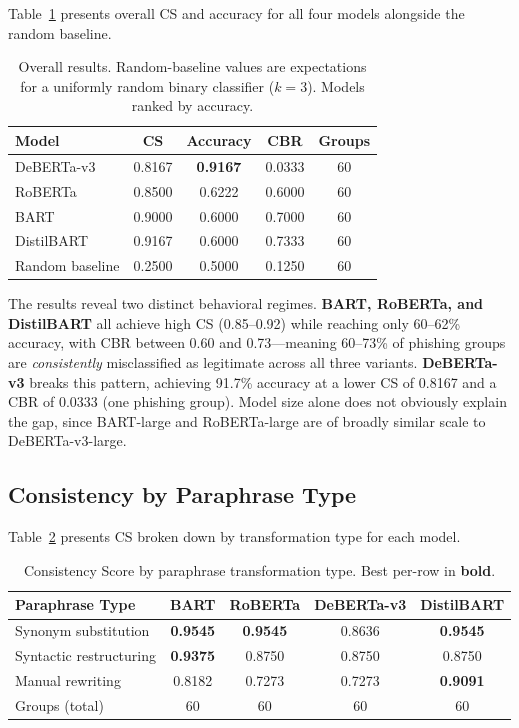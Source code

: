 \documentclass[11pt]{article}
\begin{document}
Table~\ref{tab:overall} presents overall CS and accuracy for all four models alongside the random baseline.

\begin{table}[h]
\centering
\small
\caption{Overall results. Random-baseline values are expectations for a uniformly random binary classifier ($k=3$). Models ranked by accuracy.}
\label{tab:overall}
\setlength{\tabcolsep}{9pt}
\begin{tabular}{lcccc}
\toprule
\textbf{Model} & \textbf{CS} & \textbf{Accuracy} & \textbf{CBR} & \textbf{Groups} \\
\midrule
DeBERTa-v3       & 0.8167 & \textbf{0.9167} & 0.0333 & 60 \\
RoBERTa          & 0.8500 & 0.6222 & 0.6000 & 60 \\
BART             & 0.9000 & 0.6000 & 0.7000 & 60 \\
DistilBART       & 0.9167 & 0.6000 & 0.7333 & 60 \\
\midrule
Random baseline  & 0.2500 & 0.5000 & 0.1250 & 60 \\
\bottomrule
\end{tabular}
\end{table}

The results reveal two distinct behavioral regimes. \textbf{BART, RoBERTa, and DistilBART} all achieve high CS (0.85--0.92) while reaching only 60--62\% accuracy, with CBR between 0.60 and 0.73---meaning 60--73\% of phishing groups are \textit{consistently} misclassified as legitimate across all three variants. \textbf{DeBERTa-v3} breaks this pattern, achieving 91.7\% accuracy at a lower CS of 0.8167 and a CBR of 0.0333 (one phishing group). Model size alone does not obviously explain the gap, since BART-large and RoBERTa-large are of broadly similar scale to DeBERTa-v3-large.

\subsection{Consistency by Paraphrase Type}
\label{sec:paraphrase_type}

Table~\ref{tab:paraphrase} presents CS broken down by transformation type for each model.

\begin{table}[h]
\centering
\small
\caption{Consistency Score by paraphrase transformation type. Best per-row in \textbf{bold}.}
\label{tab:paraphrase}
\setlength{\tabcolsep}{8pt}
\begin{tabular}{lcccc}
\toprule
\textbf{Paraphrase Type} & \textbf{BART} & \textbf{RoBERTa} & \textbf{DeBERTa-v3} & \textbf{DistilBART} \\
\midrule
Synonym substitution    & \textbf{0.9545} & \textbf{0.9545} & 0.8636 & \textbf{0.9545} \\
Syntactic restructuring & \textbf{0.9375} & 0.8750 & 0.8750 & 0.8750 \\
Manual rewriting        & 0.8182 & 0.7273 & 0.7273 & \textbf{0.9091} \\
\midrule
Groups (total) & 60 & 60 & 60 & 60 \\
\bottomrule
\end{tabular}
\end{table}
\end{document}

